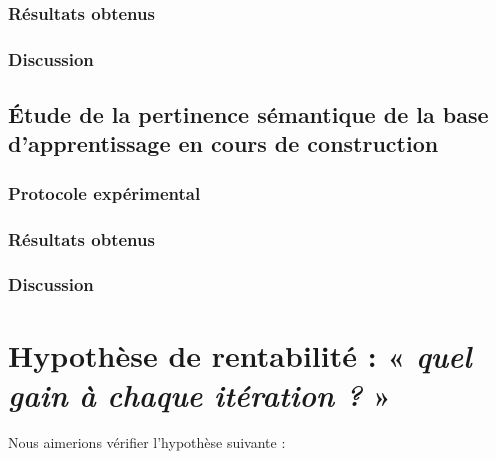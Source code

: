 			\subsubsection{Résultats obtenus}

			\subsubsection{Discussion}
		
		\subsection{Étude de la pertinence sémantique de la base d'apprentissage en cours de construction}
		
			\subsubsection{Protocole expérimental}

			\subsubsection{Résultats obtenus}

			\subsubsection{Discussion}
	

    \section{Hypothèse de rentabilité : « \textit{quel gain à chaque itération ?} »}
	\label{section:4.5-HYPOTHESE-RENTABILITE}
	
		Nous aimerions vérifier l'hypothèse suivante :

